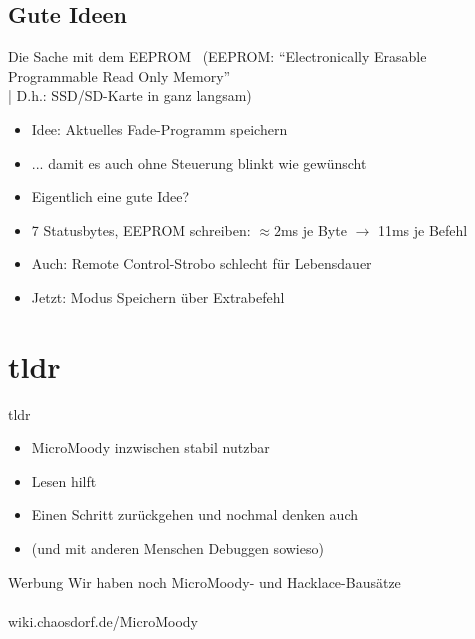 \documentclass[compress]{beamer}
\begin{document}
\subsection{Gute Ideen}
\begin{frame}{Die Sache mit dem EEPROM}
\ 
{\small (EEPROM: "`Electronically Erasable Programmable Read Only Memory"'\\
| D.h.: SSD/SD-Karte in ganz langsam)}
\begin{itemize}
\item Idee: Aktuelles Fade-Programm speichern
\item ... damit es auch ohne Steuerung blinkt wie gewünscht
\item Eigentlich eine gute Idee?
\end{itemize}
\begin{itemize}
\item 7 Statusbytes, EEPROM schreiben: $\approx 2$ms je Byte $\to$ 11ms je Befehl
\item Auch: Remote Control-Strobo schlecht für Lebensdauer
\item Jetzt: Modus Speichern über Extrabefehl
\end{itemize}
\end{frame}

\section{tldr}
\begin{frame}{tldr}
\begin{itemize}
\item MicroMoody inzwischen stabil nutzbar
\item Lesen hilft
\item Einen Schritt zurückgehen und nochmal denken auch
\item (und mit anderen Menschen Debuggen sowieso)
\end{itemize}
\end{frame}

\begin{frame}{Werbung}
Wir haben noch MicroMoody- und Hacklace-Bausätze\\
\ \\
wiki.chaosdorf.de/MicroMoody
\end{frame}
\end{document}
